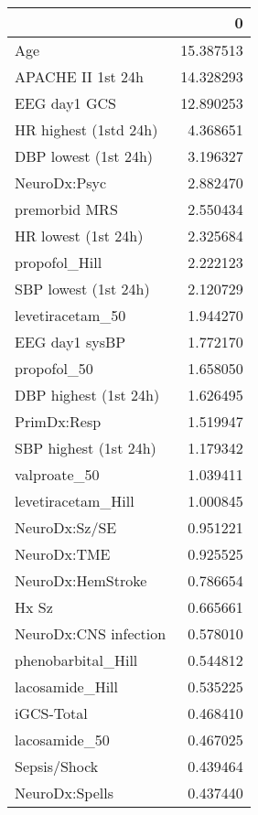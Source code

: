 \begin{tabular}{lr}
\toprule
{} &          0 \\
\midrule
Age                            &  15.387513 \\
APACHE II 1st 24h              &  14.328293 \\
EEG day1 GCS                   &  12.890253 \\
HR highest (1std 24h)          &   4.368651 \\
DBP lowest (1st 24h)           &   3.196327 \\
NeuroDx:Psyc                   &   2.882470 \\
premorbid MRS                  &   2.550434 \\
HR lowest (1st 24h)            &   2.325684 \\
propofol\_Hill                  &   2.222123 \\
SBP lowest (1st 24h)           &   2.120729 \\
levetiracetam\_50               &   1.944270 \\
EEG day1 sysBP                 &   1.772170 \\
propofol\_50                    &   1.658050 \\
DBP highest (1st 24h)          &   1.626495 \\
PrimDx:Resp                    &   1.519947 \\
SBP highest (1st 24h)          &   1.179342 \\
valproate\_50                   &   1.039411 \\
levetiracetam\_Hill             &   1.000845 \\
NeuroDx:Sz/SE                  &   0.951221 \\
NeuroDx:TME                    &   0.925525 \\
NeuroDx:HemStroke              &   0.786654 \\
Hx Sz                          &   0.665661 \\
NeuroDx:CNS infection          &   0.578010 \\
phenobarbital\_Hill             &   0.544812 \\
lacosamide\_Hill                &   0.535225 \\
iGCS-Total                     &   0.468410 \\
lacosamide\_50                  &   0.467025 \\
Sepsis/Shock                   &   0.439464 \\
NeuroDx:Spells                 &   0.437440 \\

\end{tabular}
